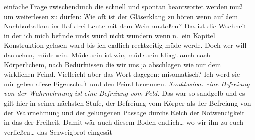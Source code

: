 \documentclass[
]{article}
\begin{document}
einfache Frage zwischendurch die schnell und spontan beantwortet werden
muß um weiterlesen zu dürfen: Wie oft ist der Gläserklang zu hören wenn
auf dem Nachbarbalkon im Hof drei Leute mit dem Wein anstoßen? Das ist
die Wachheit in der ich mich befinde unds würd nicht wundern wenn n.~ein
Kapitel Konstruktion gelesen ward bis ich endlich rechtzeitig müde
werde. Doch wer will das schon, müde sein. Müde sein ist wie, müde sein
klingt auch nach Körperlichem, nach Bedürfnissen die wir uns ja
abschlagen wie nur dem wirklichen Feind. Vielleicht aber das Wort
dagegen: misomatisch? Ich werd sie mir geben diese Eigenschaft und den
Feind benennen. \emph{Konklusion: eine Befreiung von der Wahrnehmung ist
eine Befreiung vom Feld.} Das war so sandgelb und es gilt hier in seiner
nächsten Stufe, der Befreiung vom Körper als der Befreiung von der
Wahrnehmung und der gelungenen Passage durchs Reich der Notwendigkeit in
das der Freiheit. Damit wär auch diesem Boden endlich\ldots{} wo wir ihn
zu euch verließen\ldots{} das Schweigbrot eingesät.
\end{document}
